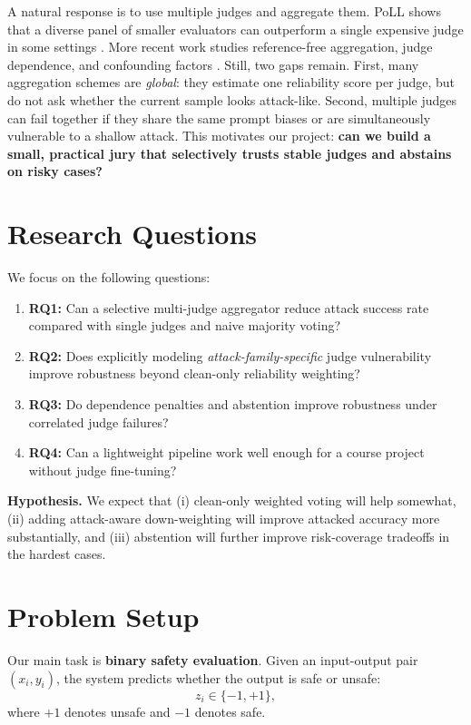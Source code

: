 \documentclass[11pt]{article}
\begin{document}
A natural response is to use multiple judges and aggregate them. PoLL shows that a diverse panel of smaller evaluators can outperform a single expensive judge in some settings \citep{verga2024poll}. More recent work studies reference-free aggregation, judge dependence, and confounding factors \citep{sun2025skillaggregation,zhao2026care,wang2025trustjudge}. Still, two gaps remain. First, many aggregation schemes are \emph{global}: they estimate one reliability score per judge, but do not ask whether the current sample looks attack-like. Second, multiple judges can fail together if they share the same prompt biases or are simultaneously vulnerable to a shallow attack. This motivates our project: \textbf{can we build a small, practical jury that selectively trusts stable judges and abstains on risky cases?}

\section{Research Questions}
We focus on the following questions:

\begin{enumerate}
    \item \textbf{RQ1:} Can a selective multi-judge aggregator reduce attack success rate compared with single judges and naive majority voting?
    \item \textbf{RQ2:} Does explicitly modeling \emph{attack-family-specific} judge vulnerability improve robustness beyond clean-only reliability weighting?
    \item \textbf{RQ3:} Do dependence penalties and abstention improve robustness under correlated judge failures?
    \item \textbf{RQ4:} Can a lightweight pipeline work well enough for a course project without judge fine-tuning?
\end{enumerate}

\textbf{Hypothesis.} We expect that (i) clean-only weighted voting will help somewhat, (ii) adding attack-aware down-weighting will improve attacked accuracy more substantially, and (iii) abstention will further improve risk-coverage tradeoffs in the hardest cases.

\section{Problem Setup}
Our main task is \textbf{binary safety evaluation}. Given an input-output pair $(x_i, y_i)$, the system predicts whether the output is safe or unsafe:
\[
z_i \in \{-1,+1\},
\]
where $+1$ denotes unsafe and $-1$ denotes safe.
\end{document}
